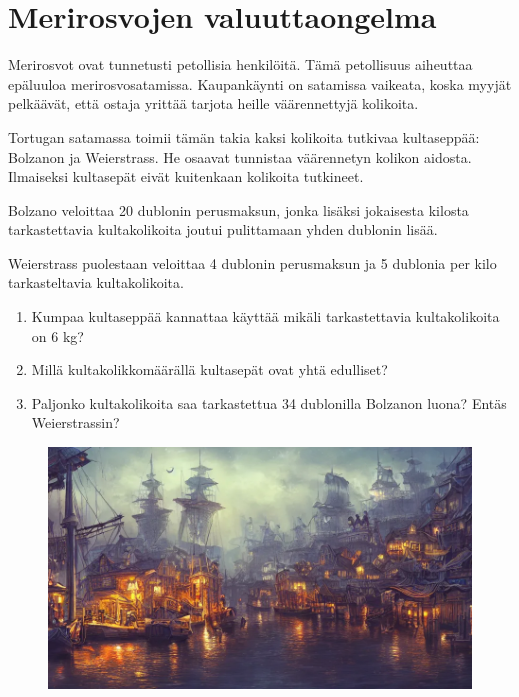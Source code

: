 \clearpage

\section{Merirosvojen valuuttaongelma}

Merirosvot ovat tunnetusti petollisia henkilöitä. Tämä petollisuus aiheuttaa epäluuloa merirosvosatamissa. Kaupankäynti on satamissa vaikeata, koska myyjät pelkäävät, että ostaja yrittää tarjota heille väärennettyjä kolikoita. 


Tortugan satamassa toimii tämän takia kaksi kolikoita tutkivaa kultaseppää: Bolzanon ja Weierstrass. He osaavat tunnistaa väärennetyn kolikon aidosta. Ilmaiseksi kultasepät eivät kuitenkaan kolikoita tutkineet.


Bolzano veloittaa 20 dublonin perusmaksun, jonka lisäksi jokaisesta kilosta tarkastettavia kultakolikoita joutui pulittamaan yhden dublonin lisää.

Weierstrass puolestaan veloittaa 4 dublonin perusmaksun ja 5 dublonia per kilo tarkasteltavia kultakolikoita.

\begin{enumerate}
    \item Kumpaa kultaseppää kannattaa käyttää mikäli tarkastettavia kultakolikoita on 6 kg?
    \item Millä kultakolikkomäärällä kultasepät ovat yhtä edulliset?
    \item Paljonko kultakolikoita saa tarkastettua 34 dublonilla Bolzanon luona? Entäs Weierstrassin?
\end{enumerate}

\begin{figure}[h]
    \centering
    \includegraphics[width=0.75\linewidth]{kuvat/merirosvo_satama.png}
\end{figure}